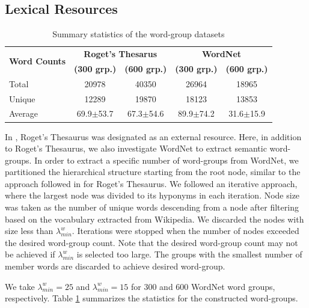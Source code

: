 \documentclass[11pt,a4paper]{article}
\begin{document}
\subsection{Lexical Resources} 
\label{app:lexical_resources}

\begin{table}
    \centering
	\begin{tabular}{lcccc}
	    \hline \hline
         \multirow{2}{*}{\textbf{Word Counts}} & \multicolumn{2}{c}{\textbf{Roget's Thesarus}}  & \multicolumn{2}{c}{\textbf{WordNet}} \\
         & \textbf{(300 grp.)} & \textbf{(600 grp.)} & \textbf{(300 grp.)} & \textbf{(600 grp.)} \\ \hline \hline %
         Total & 20978 & 40350 & 26964 & 18965 \\ 
         Unique & 12289 & 19870 & 18123 & 13853 \\
         Average & 69.9$\pm$53.7 & 67.3$\pm$54.6 & 89.9$\pm$74.2 & 31.6$\pm$15.9 \\ \hline \hline %
	\end{tabular}
	\caption{Summary statistics of the word-group datasets}
	\label{tab:roget_vs_wordnet}
\end{table}

In \citet{senel20impart}, Roget's Thesaurus \citep{Roget2008thesaurus} was designated as an external resource.
Here, in addition to Roget's Thesaurus, we also investigate  WordNet \citep{miller95wordnet} to extract semantic word-groups.
In order to extract a specific number of word-groups from WordNet, we partitioned the hierarchical structure starting from the root node, similar to the approach followed in \citet{senel20impart} for Roget's Thesaurus. We followed an iterative approach, where the largest node was divided to its hyponyms in each iteration. Node size was taken as the number of unique words descending from a node after filtering based on the vocabulary extracted from Wikipedia. We discarded the nodes with size less than $\lambda_{min}^w$. Iterations were stopped when the number of nodes exceeded the desired word-group count. Note that the desired word-group count may not be achieved if $\lambda_{min}^w$ is selected too large.
The groups with the smallest number of member words are discarded to achieve desired word-group.

We take $\lambda_{min}^w = 25$ and $\lambda_{min}^w = 15$ for 300 and 600 WordNet word groups, respectively.
Table \ref{tab:roget_vs_wordnet} summarizes the statistics for the constructed word-groups. 
\end{document}
